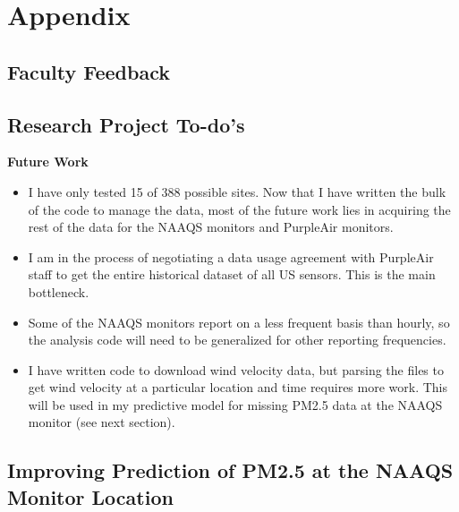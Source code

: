 \documentclass[12pt]{article}
\begin{document}


\newpage
\section{Appendix}

\subsection{Faculty Feedback} \label{sec:faculty_feedback}



\newpage
\subsection{Research Project To-do's} \label{sec:todo}
\textbf{Future Work}
\begin{itemize}
    \item I have only tested 15 of 388 possible sites. Now that I have written the bulk of the code to manage the data, most of the future work lies in acquiring the rest of the data for the NAAQS monitors and PurpleAir monitors.
    \item I am in the process of negotiating a data usage agreement with PurpleAir staff to get the entire historical dataset of all US sensors. This is the main bottleneck.
    \item Some of the NAAQS monitors report on a less frequent basis than hourly, so the analysis code will need to be generalized for other reporting frequencies.
    \item I have written code to download wind velocity data, but parsing the files to get wind velocity at a particular location and time requires more work. This will be used in my predictive model for missing PM2.5 data at the NAAQS monitor (see next section).
\end{itemize}

\subsection{Improving Prediction of PM2.5 at the NAAQS Monitor Location} \label{sec:app-prediction}

\end{document}
